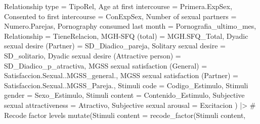 \documentclass[
  bookmarksnumbered]{article}
\newenvironment{Shaded}{\begin{snugshade}}{\end{snugshade}}
\newcommand{\AttributeTok}[1]{\textcolor[rgb]{0.80,0.80,0.80}{#1}}
\newcommand{\CommentTok}[1]{\textcolor[rgb]{0.50,0.62,0.50}{#1}}
\newcommand{\FunctionTok}[1]{\textcolor[rgb]{0.94,0.94,0.56}{#1}}
\newcommand{\NormalTok}[1]{\textcolor[rgb]{0.80,0.80,0.80}{#1}}
\newcommand{\OtherTok}[1]{\textcolor[rgb]{0.94,0.94,0.56}{#1}}
\newcommand{\SpecialCharTok}[1]{\textcolor[rgb]{0.86,0.64,0.64}{#1}}
\newcommand{\StringTok}[1]{\textcolor[rgb]{0.80,0.58,0.58}{#1}}
\begin{document}
\begin{Shaded}
\begin{Highlighting}[]
    \StringTok{\textasciigrave{}}\AttributeTok{Relationship type}\StringTok{\textasciigrave{}} \OtherTok{=}\NormalTok{ TipoRel,}
    \StringTok{\textasciigrave{}}\AttributeTok{Age at first intercourse}\StringTok{\textasciigrave{}} \OtherTok{=}\NormalTok{ Primera.ExpSex,}
    \StringTok{\textasciigrave{}}\AttributeTok{Consented to first intercourse}\StringTok{\textasciigrave{}} \OtherTok{=}\NormalTok{ ConExpSex,}
    \StringTok{\textasciigrave{}}\AttributeTok{Number of sexual partners}\StringTok{\textasciigrave{}} \OtherTok{=}\NormalTok{ Numero.Parejas,}
    \StringTok{\textasciigrave{}}\AttributeTok{Pornography consumed last month}\StringTok{\textasciigrave{}} \OtherTok{=}\NormalTok{ Pornografia\_ultimo\_mes,}
    \AttributeTok{Relationship =}\NormalTok{ TieneRelacion,}
    \StringTok{\textasciigrave{}}\AttributeTok{MGH{-}SFQ (total)}\StringTok{\textasciigrave{}} \OtherTok{=}\NormalTok{ MGH.SFQ\_Total,}
    \StringTok{\textasciigrave{}}\AttributeTok{Dyadic sexual desire (Partner)}\StringTok{\textasciigrave{}} \OtherTok{=}\NormalTok{ SD\_Diadico\_pareja,}
    \StringTok{\textasciigrave{}}\AttributeTok{Solitary sexual desire}\StringTok{\textasciigrave{}} \OtherTok{=}\NormalTok{ SD\_solitario,}
    \StringTok{\textasciigrave{}}\AttributeTok{Dyadic sexual desire (Attractive person)}\StringTok{\textasciigrave{}} \OtherTok{=}\NormalTok{ SD\_Diadico\_p\_atractiva,}
    \StringTok{\textasciigrave{}}\AttributeTok{MGSS sexual satisfaction (General)}\StringTok{\textasciigrave{}} \OtherTok{=}\NormalTok{ Satisfaccion.Sexual..MGSS\_general.,}
    \StringTok{\textasciigrave{}}\AttributeTok{MGSS sexual satisfaction (Partner)}\StringTok{\textasciigrave{}} \OtherTok{=}\NormalTok{ Satisfaccion.Sexual..MGSS\_Pareja.,}
    \StringTok{\textasciigrave{}}\AttributeTok{Stimuli code}\StringTok{\textasciigrave{}} \OtherTok{=}\NormalTok{ Codigo\_Estimulo,}
    \StringTok{\textasciigrave{}}\AttributeTok{Stimuli gender}\StringTok{\textasciigrave{}} \OtherTok{=}\NormalTok{ Sexo\_Estimulo,}
    \StringTok{\textasciigrave{}}\AttributeTok{Stimuli content}\StringTok{\textasciigrave{}} \OtherTok{=}\NormalTok{ Contenido\_Estimulo,}
    \StringTok{\textasciigrave{}}\AttributeTok{Subjective sexual attractiveness}\StringTok{\textasciigrave{}} \OtherTok{=}\NormalTok{ Atractivo,}
    \StringTok{\textasciigrave{}}\AttributeTok{Subjective sexual arousal}\StringTok{\textasciigrave{}} \OtherTok{=}\NormalTok{ Excitacion}
\NormalTok{  ) }\SpecialCharTok{|\textgreater{}}
  \CommentTok{\# Recode factor levels}
  \FunctionTok{mutate}\NormalTok{(}\StringTok{\textasciigrave{}}\AttributeTok{Stimuli content}\StringTok{\textasciigrave{}} \OtherTok{=} \FunctionTok{recode\_factor}\NormalTok{(}\StringTok{\textasciigrave{}}\AttributeTok{Stimuli content}\StringTok{\textasciigrave{}}\NormalTok{,}

\end{Highlighting}
\end{Shaded}
\end{document}

